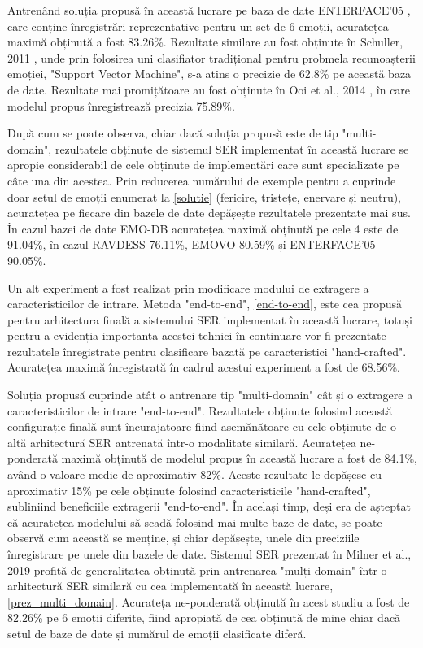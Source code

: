\documentclass[a4paper,12pt]{book}
\begin{document}
		 Antrenând soluția propusă în această lucrare pe baza de date ENTERFACE'05 \cite{enterface}, care conține înregistrări reprezentative pentru un set de 6 emoții, acuratețea maximă obținută a fost 83.26\%. Rezultate similare au fost obținute în Schuller, 2011 \cite{comp6}, unde prin folosirea uni clasifiator tradițional pentru probmela recunoașterii emoției, "Support Vector Machine", s-a atins o precizie de 62.8\% pe această baza de date. Rezultate mai promițătoare au fost obținute în Ooi et al., 2014 \cite{comp7}, în care modelul propus înregistrează precizia 75.89\%. \par
		 După cum se poate observa, chiar dacă soluția propusă este de tip "multi-domain", rezultatele obținute de sistemul SER implementat în această lucrare se apropie considerabil de cele obținute de implementări care sunt specializate pe câte una din acestea. Prin reducerea numărului de exemple pentru a cuprinde doar setul de emoții enumerat la \ref{solutie} (fericire, tristețe, enervare și neutru), acuratețea pe fiecare din bazele de date depășește rezultatele prezentate mai sus. În cazul bazei de date EMO-DB acuratețea maximă obținută pe cele 4 este de 91.04\%, în cazul RAVDESS 76.11\%, EMOVO 80.59\% și ENTERFACE'05 90.05\%.  
		 
		 \par		 
		 Un alt experiment a fost realizat prin modificare modului de extragere a caracteristicilor de intrare. Metoda "end-to-end", \ref{end-to-end}, este cea propusă pentru arhitectura finală a sistemului SER implementat în această lucrare, totuși pentru a evidenția importanța acestei tehnici în continuare vor fi prezentate rezultatele înregistrate pentru clasificare bazată pe caracteristici "hand-crafted". Acuratețea maximă înregistrată în cadrul acestui experiment a fost de 68.56\%.
		 
		 \par
		 Soluția propusă cuprinde atât o antrenare tip "multi-domain" cât și o extragere a caracteristicilor de intrare "end-to-end". Rezultatele obținute folosind această configurație finală sunt încurajatoare fiind asemănătoare cu cele obținute de o altă arhitectură SER antrenată într-o modalitate similară. Acuratețea ne-ponderată maximă obținută de modelul propus în această lucrare a fost de 84.1\%, având o valoare medie de aproximativ 82\%. Aceste rezultate le depășesc cu aproximativ 15\% pe cele obținute folosind caracteristicile "hand-crafted", subliniind beneficiile extragerii "end-to-end". În același timp, deși era de așteptat că acuratețea modelului să scadă folosind mai multe baze de date, se poate observă cum această se menține, și chiar depășește, unele din preciziile înregistrare pe unele din bazele de date. Sistemul SER prezentat în Milner et al., 2019 \cite{multi-domain} profită de generalitatea obținută prin antrenarea "mulți-domain" într-o arhitectură SER similară cu cea implementată în această lucrare, \ref{prez_multi_domain}. Acurateța ne-ponderată obținută în acest studiu a fost de 82.26\% pe 6 emoții diferite, fiind apropiată de cea obținută de mine chiar dacă setul de baze de date și numărul de emoții clasificate diferă. \par		 
		 
\end{document}
